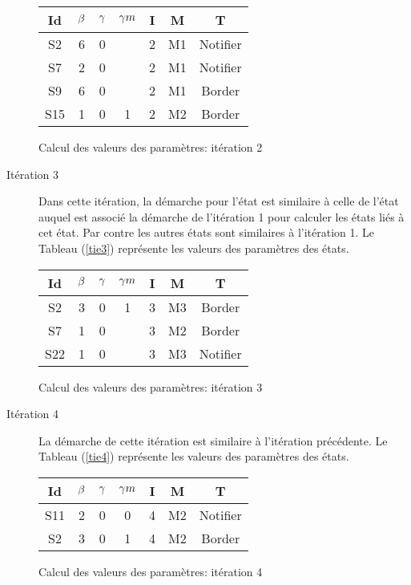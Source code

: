 \begin{Exemple}
\begin{description}
\begin{tableth}
\begin{tabular}{|*{7}{c|}}
		\hline
		Id&$\beta{}$&	$\gamma{}$	&$\gamma m{}$ &	I&	M&	T\\ \hline
		S2&		6&	0&	&	2&	M1&	Notifier\\ \hline
		S7&		2&	0&	&	2&	M1&	Notifier\\ \hline
		S9&		6&	0&	&	2&	M1&	Border\\ \hline
		S15&	1&	0&	1&	2&	M2&	Border\\ \hline		
	\end{tabular}
	\caption{Calcul des valeurs des paramètres: itération 2}\label{tie2}
\end{tableth}
\item[Itération 3] Dans cette itération, la démarche pour l'état  est similaire à celle de l'état  auquel est associé la démarche de l'itération 1 pour calculer les états liés à cet état. Par contre les autres états sont similaires à l'itération 1. Le Tableau (\ref{tie3}) représente les valeurs des paramètres  des états. 
\begin{tableth}
	\centering
	\begin{tabular}{|*{7}{c|}}
		\hline
		Id&$\beta{}$&	$\gamma{}$	&$\gamma m{}$ &	I&	M&	T\\ \hline
		S2&		3&	0&	1&	3&	M3&	Border\\ \hline
		S7&		1&	0&	&	3&	M2&	Border\\ \hline
		S22&	1&	0&	&	3&	M3&	Notifier\\ \hline	
	\end{tabular}
	\caption{Calcul des valeurs des paramètres: itération 3}\label{tie3}
\end{tableth}

\item[Itération 4] La démarche de cette itération est similaire à l'itération précédente. Le Tableau (\ref{tie4}) représente les valeurs des paramètres  des états.  
\begin{tableth}
	\centering
	\begin{tabular}{|*{7}{c|}}
		\hline
		Id&$\beta{}$&	$\gamma{}$	&$\gamma m{}$ &	I&	M&	T\\ \hline
		S11&	2&	0&	0&	4&	M2&	Notifier\\ \hline
		S2&		3&	0&	1&	4&	M2&	Border\\ \hline
	\end{tabular}
	\caption{Calcul des valeurs des paramètres: itération 4}\label{tie4}
\end{tableth}


\end{description}
\end{Exemple}
